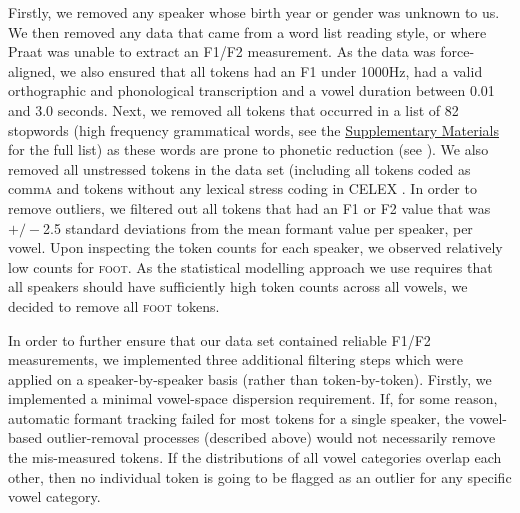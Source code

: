 \documentclass[review]{elsarticle} %
\begin{document}
Firstly, we removed any speaker whose birth year or gender was unknown to us.  We then removed any data that came from a word list reading style, or where Praat was unable to extract an F1/F2 measurement. As the data was force-aligned, we also ensured that all tokens had an F1 under 1000Hz, had a valid orthographic and phonological transcription and a vowel duration between 0.01 and 3.0 seconds. Next, we removed all tokens that occurred in a list of 82 stopwords (high frequency grammatical words, see the \hyperref[sec:supplementarymaterials]{Supplementary Materials} for the full list) as these words are prone to phonetic reduction (see \citealt{hay2015tracking}). We also removed all unstressed tokens in the data set (including all tokens coded as comm\textsc{a} and tokens without any lexical stress coding in CELEX \citep{baayen1995celex}. In order to remove outliers, we filtered out all tokens that had an F1 or F2 value that was $+/-$2.5 standard deviations from the mean formant value per speaker, per vowel. Upon inspecting the token counts for each speaker, we observed relatively low counts for \textsc{foot}. As the statistical modelling approach we use requires that all speakers should have sufficiently high token counts across all vowels, we decided to remove all \textsc{foot} tokens.

In order to further ensure that our data set contained reliable F1/F2 measurements, we implemented three additional filtering steps which were applied on a speaker-by-speaker basis (rather than token-by-token). Firstly, we implemented a minimal vowel-space dispersion requirement.  If, for some reason, automatic formant tracking failed for most tokens for a single speaker, the vowel-based outlier-removal processes (described above) would not necessarily remove the mis-measured tokens.  If the distributions of all vowel categories overlap each other, then no individual token is going to be flagged as an outlier for any specific vowel category.  
\end{document}
